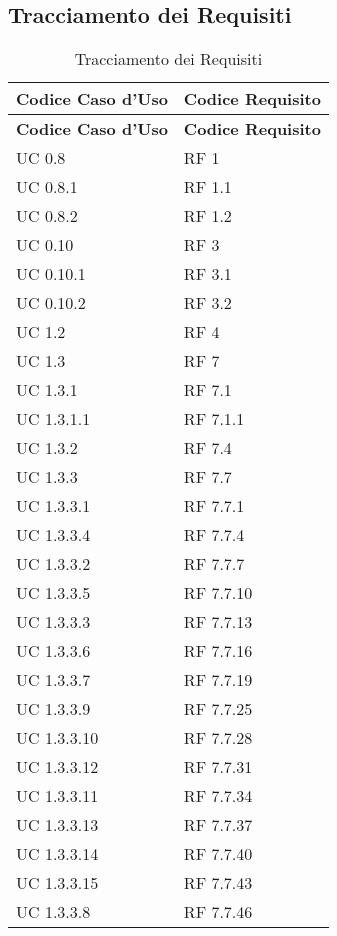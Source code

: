 \subsection{Tracciamento dei Requisiti}{ 
\renewcommand*{\arraystretch}{1.4} 
\begin{longtable} [c]{| p{4cm} | p{4cm} |} 
\caption{Tracciamento dei Requisiti \label{tab:traccReq}}\\ \hline\textbf{Codice Caso d'Uso} & \textbf{Codice Requisito} \\ 
\hline \endfirsthead \hline 
\textbf{Codice Caso d'Uso} & \textbf{Codice Requisito} \\ 
\hline \endhead \hline \endfoot \hline \endlastfoot 
UC 0.8 & RF 1\\ 
 \hline 
UC 0.8.1 & RF 1.1\\ 
 \hline 
UC 0.8.2 & RF 1.2\\ 
 \hline 
UC 0.10 & RF 3\\ 
 \hline 
UC 0.10.1 & RF 3.1\\ 
 \hline 
UC 0.10.2 & RF 3.2\\ 
 \hline 
UC 1.2 & RF 4\\ 
 \hline 
UC 1.3 & RF 7\\ 
 \hline 
UC 1.3.1 & RF 7.1\\ 
 \hline 
UC 1.3.1.1 & RF 7.1.1\\ 
 \hline 
UC 1.3.2 & RF 7.4\\ 
 \hline 
UC 1.3.3 & RF 7.7\\ 
 \hline 
UC 1.3.3.1 & RF 7.7.1\\ 
 \hline 
UC 1.3.3.4 & RF 7.7.4\\ 
 \hline 
UC 1.3.3.2 & RF 7.7.7\\ 
 \hline 
UC 1.3.3.5 & RF 7.7.10\\ 
 \hline 
UC 1.3.3.3 & RF 7.7.13\\ 
 \hline 
UC 1.3.3.6 & RF 7.7.16\\ 
 \hline 
UC 1.3.3.7 & RF 7.7.19\\ 
 \hline 
UC 1.3.3.9 & RF 7.7.25\\ 
 \hline 
UC 1.3.3.10 & RF 7.7.28\\ 
 \hline 
UC 1.3.3.12 & RF 7.7.31\\ 
 \hline 
UC 1.3.3.11 & RF 7.7.34\\ 
 \hline 
UC 1.3.3.13 & RF 7.7.37\\ 
 \hline 
UC 1.3.3.14 & RF 7.7.40\\ 
 \hline 
UC 1.3.3.15 & RF 7.7.43\\ 
 \hline 
UC 1.3.3.8 & RF 7.7.46\\ 

\end{longtable}}

